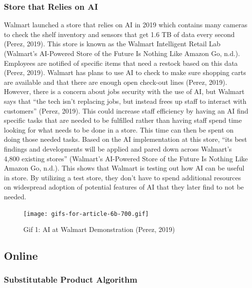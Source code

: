 \documentclass[
]{article}
\begin{document}
\hypertarget{store-that-relies-on-ai}{%
\subsubsection{Store that Relies on AI}\label{store-that-relies-on-ai}}

Walmart launched a store that relies on AI in 2019 which contains many cameras to check the shelf inventory and sensors that get 1.6 TB of data every second (Perez, 2019). This store is known as the Walmart Intelligent Retail Lab (Walmart's AI-Powered Store of the Future Is Nothing Like Amazon Go, n.d.). Employees are notified of specific items that need a restock based on this data (Perez, 2019). Walmart has plans to use AI to check to make sure shopping carts are available and that there are enough open check-out lines (Perez, 2019). However, there is a concern about jobs security with the use of AI, but Walmart says that ``the tech isn't replacing jobs, but instead frees up staff to interact with customers'' (Perez, 2019). This could increase staff efficiency by having an AI find specific tasks that are needed to be fulfilled rather than having staff spend time looking for what needs to be done in a store. This time can then be spent on doing those needed tasks. Based on the AI implementation at this store, ``its best findings and developments will be applied and pared down across Walmart's 4,800 existing stores'' (Walmart's AI-Powered Store of the Future Is Nothing Like Amazon Go, n.d.). This shows that Walmart is testing out how AI can be useful in store. By utilizing a test store, they don't have to spend additional resources on widespread adoption of potential features of AI that they later find to not be needed.

\begin{figure}
\centering
\texttt{[image: gifs-for-article-6b-700.gif]}
\caption{Gif 1: AI at Walmart Demonstration (Perez, 2019)}
\end{figure}

\hypertarget{online}{%
\subsection{Online}\label{online}}

\hypertarget{substitutable-product-algorithm}{%
\subsubsection{Substitutable Product Algorithm}\label{substitutable-product-algorithm}}
\end{document}
